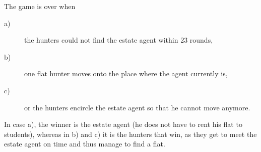 The game is over when

  \begin{description}
    \item[a)]the hunters could not find the estate agent within 23 rounds,
    \item[b)]one flat hunter moves onto the place where the agent currently is,
    \item[c)]or the hunters encircle the estate agent so that he cannot move anymore.
  \end{description}

In case a), the winner is the estate agent (he does not have to rent his flat to students), whereas in b) and c) it is the hunters that win, as they get to meet the estate agent on time and thus manage to find a flat.

